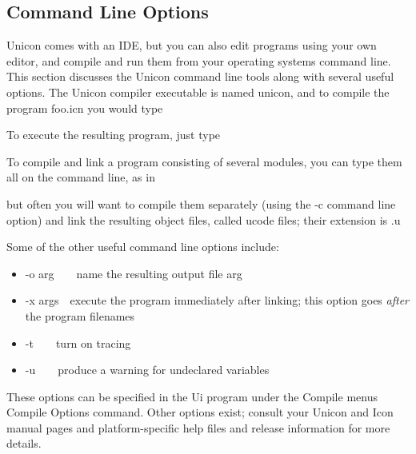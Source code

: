 \subsection{Command Line Options}

Unicon comes with an IDE, but you can also edit programs using your own
editor, and compile and run them from your operating
system{\textquotesingle}s command line. This section discusses the
Unicon command line tools along with several useful options. The Unicon
compiler executable is named unicon, and to compile the program foo.icn
you would type


\noindent To execute the resulting program, just type


To compile and link a program consisting of several modules, you can
type them all on the command line, as in


\noindent but often you will want to compile them separately
(using the -c command line option) and link the resulting object
files, called ucode files; their extension is .u


Some of the other useful command line options include:

\begin{itemize}
\item \textsf{{}-o arg}\ \ \ \ name the resulting output file arg
\item \textsf{{}-x args}\ \ execute the program immediately after linking;
		 this option goes \textit{after} the program filenames
\item \textsf{{}-t}\ \ \ \ turn on tracing
\item \textsf{{}-u}\ \ \ \ produce a warning for undeclared variables
\end{itemize}

These options can be specified in the Ui program under the Compile
menu{\textquotesingle}s Compile Options command. Other options exist;
consult your Unicon and Icon manual pages and platform-specific help
files and release information for more details.

